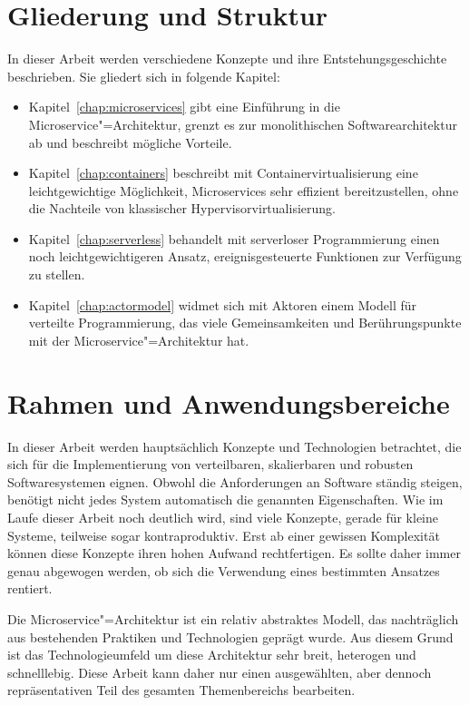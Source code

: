 \section{Gliederung und Struktur}

In dieser Arbeit werden verschiedene Konzepte und ihre Entstehungsgeschichte beschrieben. Sie gliedert sich in folgende Kapitel:

\begin{itemize}
	\item Kapitel~\ref{chap:microservices} gibt eine Einführung in die Microservice"=Architektur, grenzt es zur monolithischen Softwarearchitektur ab und beschreibt mögliche Vorteile.
	\item Kapitel~\ref{chap:containers} beschreibt mit Containervirtualisierung eine leichtgewichtige Möglichkeit, Microservices sehr effizient bereitzustellen, ohne die Nachteile von klassischer Hypervisorvirtualisierung.
	\item Kapitel~\ref{chap:serverless} behandelt mit serverloser Programmierung einen noch leichtgewichtigeren Ansatz, ereignisgesteuerte Funktionen zur Verfügung zu stellen. 
	\item Kapitel~\ref{chap:actormodel} widmet sich mit Aktoren einem Modell für verteilte Programmierung, das viele Gemeinsamkeiten und Berührungspunkte mit der Microservice"=Architektur hat.
\end{itemize}

\section{Rahmen und Anwendungsbereiche}

In dieser Arbeit werden hauptsächlich Konzepte und Technologien betrachtet, die sich für die Implementierung von verteilbaren, skalierbaren und robusten Softwaresystemen eignen. Obwohl die Anforderungen an Software ständig steigen, benötigt nicht jedes System automatisch die genannten Eigenschaften. Wie im Laufe dieser Arbeit noch deutlich wird, sind viele Konzepte, gerade für kleine Systeme, teilweise sogar kontraproduktiv. Erst ab einer gewissen Komplexität können diese Konzepte ihren hohen Aufwand rechtfertigen. Es sollte daher immer genau abgewogen werden, ob sich die Verwendung eines bestimmten Ansatzes rentiert.

Die Microservice"=Architektur ist ein relativ abstraktes Modell, das nachträglich aus bestehenden Praktiken und Technologien geprägt wurde. Aus diesem Grund ist das Technologieumfeld um diese Architektur sehr breit, heterogen und schnelllebig. Diese Arbeit kann daher nur einen ausgewählten, aber dennoch repräsentativen Teil des gesamten Themenbereichs bearbeiten.

